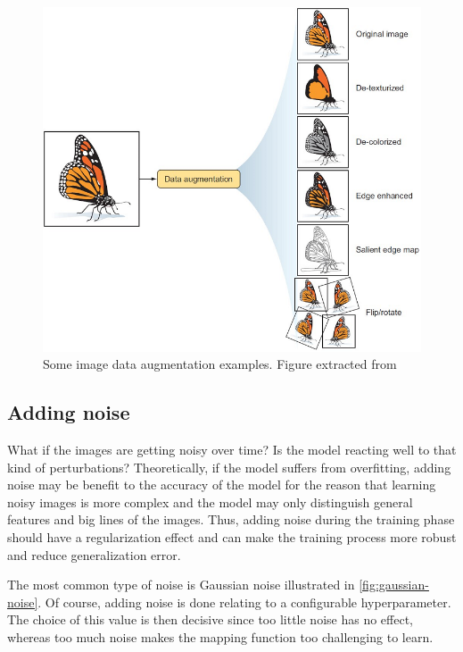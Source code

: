 \documentclass[11pt, openany]{report}
\theoremstyle{plain}
\theoremstyle{definition}
\theoremstyle{remark}
\begin{document}
\begin{figure}[H]
  \centering
  \includegraphics[scale=0.55]{figures/data_augmentation.png}
  \caption{Some image data augmentation examples. Figure extracted from \cite{data-aug-examples}}
  \label{fig:dropout}
\end{figure}


\subsection{Adding noise} \label{sec:noise-cifar}
What if the images are getting noisy over time? Is the model reacting well to that kind of perturbations? Theoretically, if the model suffers from overfitting, adding noise may be benefit to the accuracy of the model for the reason that learning noisy images is more complex and the model may only distinguish general features and big lines of the images.
Thus, adding noise during the training phase should have a regularization effect and can make the training process more robust and reduce generalization error. 

The most common type of noise is Gaussian noise illustrated in \autoref{fig:gaussian-noise}. Of course, adding noise is done relating to a configurable hyperparameter. The choice of this value is then decisive since too little noise has no effect, whereas too much noise makes the mapping function too challenging to learn. 
\end{document}
